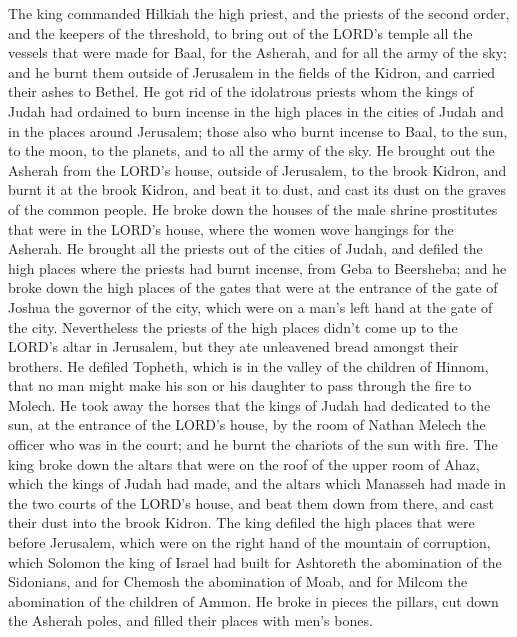  The king commanded Hilkiah the high priest, and the
priests of the second order, and the keepers of the threshold, to bring
out of the LORD's temple all the vessels that were made for Baal, for
the Asherah, and for all the army of the sky; and he burnt them outside
of Jerusalem in the fields of the Kidron, and carried their ashes to
Bethel.  He got rid of the idolatrous priests whom the
kings of Judah had ordained to burn incense in the high places in the
cities of Judah and in the places around Jerusalem; those also who burnt
incense to Baal, to the sun, to the moon, to the planets, and to all the
army of the sky.  He brought out the Asherah from the
LORD's house, outside of Jerusalem, to the brook Kidron, and burnt it at
the brook Kidron, and beat it to dust, and cast its dust on the graves
of the common people.  He broke down the houses of the
male shrine prostitutes that were in the LORD's house, where the women
wove hangings for the Asherah.  He brought all the priests
out of the cities of Judah, and defiled the high places where the
priests had burnt incense, from Geba to Beersheba; and he broke down the
high places of the gates that were at the entrance of the gate of Joshua
the governor of the city, which were on a man's left hand at the gate of
the city.  Nevertheless the priests of the high places
didn't come up to the LORD's altar in Jerusalem, but they ate unleavened
bread amongst their brothers.  He defiled Topheth, which
is in the valley of the children of Hinnom, that no man might make his
son or his daughter to pass through the fire to Molech. 
He took away the horses that the kings of Judah had dedicated to the
sun, at the entrance of the LORD's house, by the room of Nathan Melech
the officer who was in the court; and he burnt the chariots of the sun
with fire.  The king broke down the altars that were on
the roof of the upper room of Ahaz, which the kings of Judah had made,
and the altars which Manasseh had made in the two courts of the LORD's
house, and beat them down from there, and cast their dust into the brook
Kidron.  The king defiled the high places that were
before Jerusalem, which were on the right hand of the mountain of
corruption, which Solomon the king of Israel had built for Ashtoreth the
abomination of the Sidonians, and for Chemosh the abomination of Moab,
and for Milcom the abomination of the children of Ammon. 
He broke in pieces the pillars, cut down the Asherah poles, and filled
their places with men's bones.


